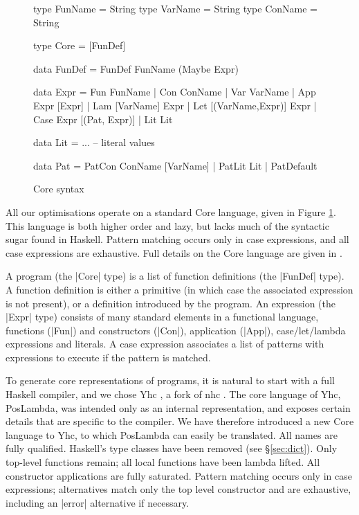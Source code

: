 \documentclass{llncs}
\begin{document}
\begin{figure}
\begin{code}
type FunName  = String
type VarName  = String
type ConName  = String

type Core = [FunDef]

data FunDef  =  FunDef FunName (Maybe Expr)

data Expr  =  Fun   FunName
           |  Con   ConName
           |  Var   VarName
           |  App   Expr [Expr]
           |  Lam   [VarName] Expr
           |  Let   [(VarName,Expr)] Expr
           |  Case  Expr [(Pat, Expr)]
           |  Lit   Lit

data Lit = ... -- literal values

data Pat = PatCon  ConName [VarName]
         | PatLit  Lit
         | PatDefault
\end{code}
\caption{Core syntax}
\label{fig:core}
\end{figure}

All our optimisations operate on a standard Core language, given in Figure \ref{fig:core}. This language is both higher order and lazy, but lacks much of the syntactic sugar found in Haskell. Pattern matching occurs only in case expressions, and all case expressions are exhaustive. Full details on the Core language are given in \cite{me:yhc_core}.

A program (the |Core| type) is a list of function definitions (the |FunDef| type). A function definition is either a primitive (in which case the associated expression is not present), or a definition introduced by the program. An expression (the |Expr| type) consists of many standard elements in a functional language, functions (|Fun|) and constructors (|Con|), application (|App|), case/let/lambda expressions and literals. A case expression associates a list of patterns with expressions to execute if the pattern is matched.

To generate core representations of programs, it is natural to start with a full Haskell compiler, and we chose Yhc \cite{me:yhc_core}, a fork of nhc \cite{nhc}. The core language of Yhc, PosLambda, was intended only as an internal representation, and exposes certain details that are specific to the compiler. We have therefore introduced a new Core language to Yhc, to which PosLambda can easily be translated. All names are fully qualified. Haskell's type classes have been removed (see \S\ref{sec:dict}). Only top-level functions remain; all local functions have been lambda lifted. All constructor applications are fully saturated. Pattern matching occurs only in case expressions; alternatives match only the top level constructor and are exhaustive, including an |error| alternative if necessary.
\end{document}
